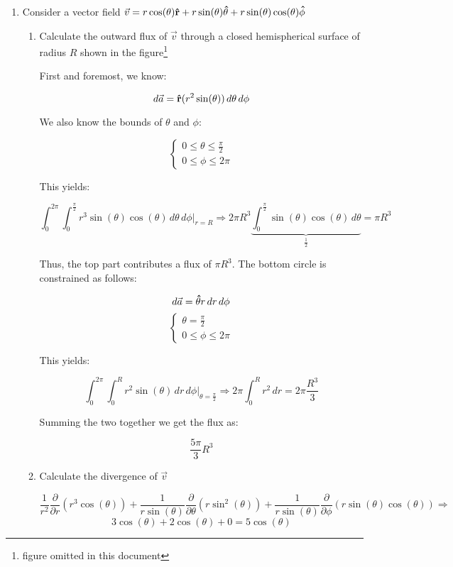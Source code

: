\begin{enumerate}
  \item Consider a vector field $\vec{v}=r\cos(\theta)\bold{\hat{r}}+r\sin(\theta)\bold{\hat{\theta}}+r\sin(\theta)\cos(\theta)\bold{\hat{\phi}}$

    \begin{enumerate}

      \item Calculate the outward flux of $\vec{v}$ through a closed hemispherical surface of radius $R$ shown in the figure\footnote{figure omitted in this document}

        First and foremost, we know:

        $$d\vec{a}=\bold{\hat{r}}(r^2\sin(\theta))\,d\theta\,d\phi$$

        We also know the bounds of $\theta$ and $\phi$:

        $$\left\{\begin{array}{l} 0\leq\theta\leq\frac{\pi}{2}\\0\leq\phi\leq2\pi\end{array}$$

          This yields:

          $$\int_0^{2\pi}\int_0^{\frac{\pi}{2}} r^3\sin(\theta)\cos(\theta)\,d\theta\,d\phi\Big|_{r=R}\Rightarrow2\pi R^3\underbrace{\int_0^{\frac{\pi}{2}} \sin(\theta)\cos(\theta)\,d\theta}_{\frac{1}{2}}=\pi R^3$$

          Thus, the top part contributes a flux of $\pi R^3$. The bottom circle is constrained as follows:

          $$d\vec{a}=\bold{\hat{\theta}}r\,dr\,d\phi$$
          $$\left\{\begin{array}{l} \theta = \frac{\pi}{2}\\ 0\leq \phi\leq 2\pi\end{array}$$

            This yields:

            $$\int_0^{2\pi}\int_0^R r^2\sin(\theta)\,dr\,d\phi\Big|_{\theta=\frac{\pi}{2}}\Rightarrow 2\pi\int_0^Rr^2\,dr=2\pi \frac{R^3}{3}$$

            Summing the two together we get the flux as:

            $$\boxed{\frac{5\pi}{3}R^3}$$

      \item Calculate the divergence of $\vec{v}$

        $$\frac{1}{r^2}\frac{\partial}{\partial r}(r^3\cos(\theta))+\frac{1}{r\sin(\theta)}\frac{\partial}{\partial \theta}(r\sin^2(\theta))+\frac{1}{r\sin(\theta)}\frac{\partial}{\partial \phi}(r\sin(\theta)\cos(\theta))\Rightarrow$$
        $$3\cos(\theta)+2\cos(\theta)+0=\boxed{5\cos(\theta)}$$


\end{enumerate}
\end{enumerate}
